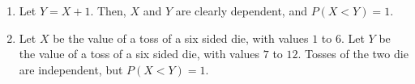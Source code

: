 \begin{enumerate}[label=(\alph*)]
\item Let $Y = X + 1$. Then, $X$ and $Y$ are clearly dependent, and $P(X < Y) =
1$.

\item Let $X$ be the value of a toss of a six sided die, with values $1$ to $6$.
Let $Y$ be the value of a toss of a six sided die, with values $7$ to $12$.
Tosses of the two die are independent, but $P(X < Y) = 1$.
\end{enumerate}
